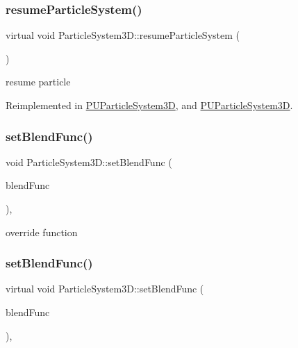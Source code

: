 \subsubsection{\texorpdfstring{resume\+Particle\+System()}{resumeParticleSystem()}\hspace{0.1cm}{\footnotesize\ttfamily [2/2]}}
{\footnotesize\ttfamily virtual void Particle\+System3\+D\+::resume\+Particle\+System (\begin{DoxyParamCaption}{ }\end{DoxyParamCaption})\hspace{0.3cm}{\ttfamily [virtual]}}

resume particle 

Reimplemented in \hyperlink{classPUParticleSystem3D_a02c88addf5387a7062e6418d6e8584c4}{P\+U\+Particle\+System3D}, and \hyperlink{classPUParticleSystem3D_a3a7be465950fdb5ad401eb436ec8ff32}{P\+U\+Particle\+System3D}.

\mbox{\label{classParticleSystem3D_a93c7e5313e8860628304814631edfb94}} 
\subsubsection{\texorpdfstring{set\+Blend\+Func()}{setBlendFunc()}\hspace{0.1cm}{\footnotesize\ttfamily [1/2]}}
{\footnotesize\ttfamily void Particle\+System3\+D\+::set\+Blend\+Func (\begin{DoxyParamCaption}\item[{const \hyperlink{structBlendFunc}{Blend\+Func} \&}]{blend\+Func }\end{DoxyParamCaption})\hspace{0.3cm}{\ttfamily [override]}, {\ttfamily [virtual]}}

override function \mbox{\label{classParticleSystem3D_a4a1a9b7ade8b4ed237a1bb7da3ff462e}} 
\subsubsection{\texorpdfstring{set\+Blend\+Func()}{setBlendFunc()}\hspace{0.1cm}{\footnotesize\ttfamily [2/2]}}
{\footnotesize\ttfamily virtual void Particle\+System3\+D\+::set\+Blend\+Func (\begin{DoxyParamCaption}\item[{const \hyperlink{structBlendFunc}{Blend\+Func} \&}]{blend\+Func }\end{DoxyParamCaption})\hspace{0.3cm}{\ttfamily [override]}, {\ttfamily [virtual]}}

